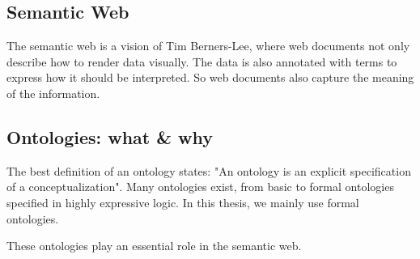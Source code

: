 \subsection{Semantic Web}
The semantic web is a vision of Tim Berners-Lee, where web documents not only describe how to render data visually. The data is also annotated with terms to express how it should be interpreted. So web documents also capture the meaning of the information.

\subsection{Ontologies: what \& why}
The best definition of an ontology states: "An ontology is an explicit specification of a conceptualization"\cite{GRUBER1993199}. Many ontologies exist, from basic to formal ontologies specified in highly expressive logic. In this thesis, we mainly use formal ontologies.

These ontologies play an essential role in the semantic web. 